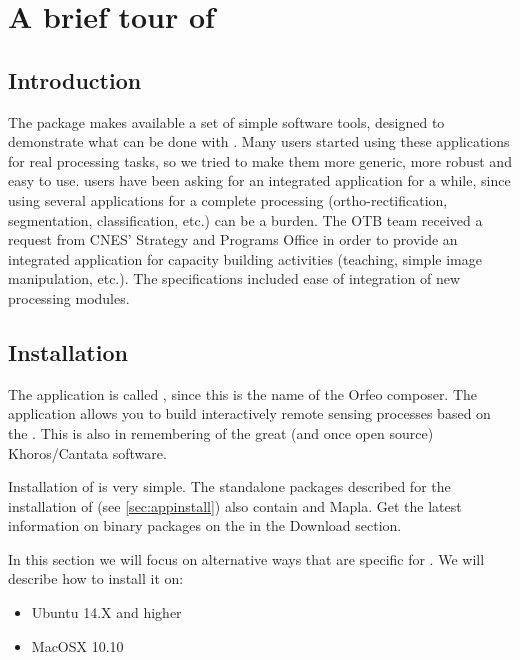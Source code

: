 \chapter{A brief tour of \mont}\label{chap:Monteverdi} 

\section{Introduction}\label{sec:montintro}
The \app package makes available a set of simple software
tools, designed to demonstrate what can be done with
\otb. Many users started using these applications for real processing
tasks, so we tried to make them more generic, more robust and easy to
use. \otb users have been asking for an integrated application for a
while, since using several applications for a complete processing
(ortho-rectification, segmentation, classification, etc.) can be a
burden. The OTB team received a request from CNES' Strategy
and Programs Office in order to provide an integrated application for
capacity building activities (teaching, simple image manipulation,
etc.). The specifications included ease of integration of new
processing modules.  


\section{Installation}\label{sec:montinstall}

The application is called \mont, since this is the name of the Orfeo
composer. The application allows you to build interactively remote
sensing processes based on the \otb. This is also in
remembering of the great (and once open source) Khoros/Cantata
software.
  
Installation of \mont is very simple. The standalone packages described for the
installation of \app (see \ref{sec:appinstall}) also contain \mont and Mapla.
Get the latest information on binary packages on the \website in the Download section.


In this section we will focus on alternative ways that are specific for \mont.
We will describe how to install it on:
\begin{itemize}
\item Ubuntu 14.X and higher
\item MacOSX 10.10
\end{itemize}

